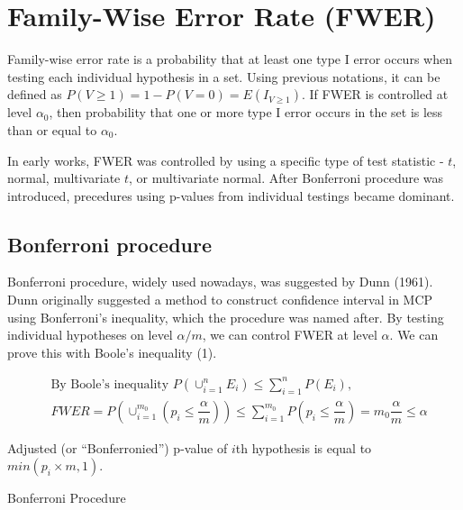\documentclass[a4paper, 11pt, oneside]{article}
\makeatletter
\def\BState{\State\hskip-\ALG@thistlm}
\makeatother
\begin{document}
\section{Family-Wise Error Rate (FWER)}
Family-wise error rate is a probability that at least one type I error occurs when testing each individual hypothesis in a set. Using previous notations, it can be defined as $P(V \geq 1) = 1 - P(V=0) = E(I_{V \geq 1})$. If FWER is controlled at level $\alpha_0$, then probability that one or more type I error occurs in the set is less than or equal to $\alpha_0$. \par
    In early works, FWER was controlled by using a specific type of test statistic - $t$, normal, multivariate $t$, or multivariate normal. After Bonferroni procedure was introduced, precedures using p-values from individual testings became dominant.

\subsection{Bonferroni procedure}
Bonferroni procedure, widely used nowadays, was suggested by Dunn (1961). Dunn originally suggested a method to construct confidence interval in MCP using Bonferroni's inequality, which the procedure was named after. By testing individual hypotheses on level $\alpha/m$, we can control FWER at level $\alpha$. We can prove this with Boole's inequality (1).

\begin{equation}
\begin{aligned}\label{proof-bonf}
&\text{By Boole's inequality }P(\cup_{i=1}^{n}E_i)\leq\sum_{i=1}^n P(E_i),\\
& FWER=P(\cup_{i=1}^{m_0}(p_i\leq\dfrac{\alpha}{m}))\leq\sum_{i=1}^{m_0}P(p_i\leq\dfrac{\alpha}{m})=m_0\dfrac{\alpha}m\leq\alpha
\end{aligned}
\end{equation}

Adjusted (or \enquote{Bonferronied}) p-value of $i$th hypothesis is equal to $min(p_i \times m, 1)$.

\begin{algorithm}
\caption{Bonferroni Procedure}\label{bonf}
\end{algorithm}
\end{document}
